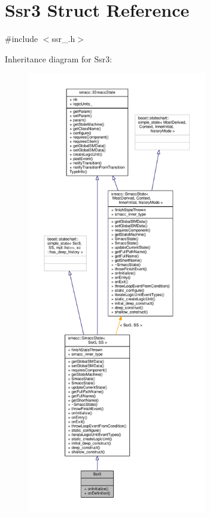 \hypertarget{structSsr3}{}\section{Ssr3 Struct Reference}
\label{structSsr3}


{\ttfamily \#include $<$ssr\+\_.\+h$>$}



Inheritance diagram for Ssr3\+:
\nopagebreak
\begin{figure}[H]
\begin{center}
\leavevmode
\includegraphics[height=550pt]{structSsr3__inherit__graph}
\end{center}
\end{figure}


